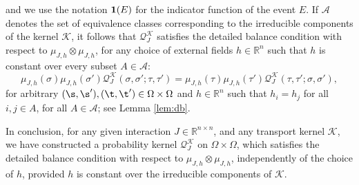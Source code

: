 \documentclass[11pt,reqno]{amsart}
\numberwithin{equation}{section}
\numberwithin{figure}{section}
\newcommand{\1}{\mathds{1}}
\newcommand{\cA}{\ensuremath{\mathcal A}}
\newcommand{\cK}{\ensuremath{\mathcal K}}
\newcommand{\cQ}{\ensuremath{\mathcal Q}}
\newcommand{\bbR}{{\ensuremath{\mathbb R}} }
\begin{document}
    and we use the notation ${\bf 1}(E)$ for the indicator function of the event $E$. 
If $\cA$ denotes the set of equivalence classes corresponding to the irreducible components of the kernel $\cK$,
it follows that $\cQ_J^{\cK}$ satisfies the detailed balance condition with respect to $\mu_{J,h}\otimes\mu_{J,h}$, for any choice of external fields $h\in\bbR^n$ such that $h$ is constant over every subset $A\in \cA$:
\begin{equation}\label{gxk5}
\mu_{J,h}(\sigma) \mu_{J,h}(\sigma')\cQ_J^{\cK}(\sigma, \sigma'; \tau, \tau') = \mu_{J,h}(\tau) \mu_{J,h}(\tau') \cQ_J^{\cK}(\tau, \tau'; \sigma, \sigma'),
\end{equation}
for arbitrary $(\s,\s'),(\t,\t')\in\Omega\times\Omega$ and $h\in\bbR^n$ such that $h_i=h_j$ for all $i,j\in A$, for all $A\in \cA$; see Lemma \ref{lem:db}. 


In conclusion, for any given interaction $J\in\bbR^{n\times n}$, and any transport kernel $\cK$, we have constructed a probability kernel $\cQ_J^\cK$ on $\Omega\times\Omega$, which satisfies the detailed balance condition with respect to $\mu_{J,h}\otimes\mu_{J,h}$, independently of the choice of $h$, provided $h$ is constant over the irreducible components of $\cK$. 
\end{document}
